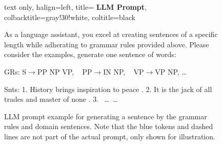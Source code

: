 
\begin{figure}[t]
    \vspace{0.5mm}
    \footnotesize
    \begin{tcblisting}{text only, 
        halign=left, 
        title= \textbf{LLM Prompt}, 
        colbacktitle=gray!30!white, 
        coltitle=black
    }
    
    \textsf{\fontsize{8}{0}\selectfont
    As a language assistant, you excel at creating sentences of a specific length while adherating to  grammar rules provided above. 
    Please consider the  examples, generate one sentence of  words:
    }

    \vspace{-6pt} \hdashrule{\linewidth}{0.4pt}{.5mm} \vspace{-12pt}

    \textsf{\fontsize{8}{0}\selectfont
    {\color{blue} GRs:}
     S$\rightarrow$PP NP VP, ~
     PP$\rightarrow$IN NP, ~
     VP$\rightarrow$VP NP, \dots
    }

    \vspace{-6pt} \hdashrule{\linewidth}{0.4pt}{.5mm} \vspace{-12pt}

     \textsf{\fontsize{8}{1}\selectfont
     {\color{blue} Snts:} 
        1. History brings inspiration to peace . 
        2. It is the jack of all trades and master of none . 
        3. ~\dots~\dots
     }

    \end{tcblisting}
    \caption{LLM prompt example for generating a sentence by the grammar rules and domain sentences. Note that the blue tokens and dashed lines are not part of the actual prompt, only shown for illustration.}
    \label{fig:prompt}
\end{figure}